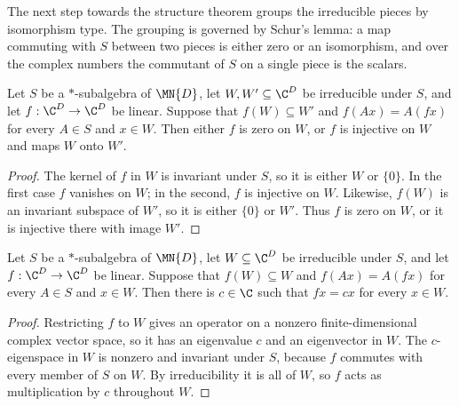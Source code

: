 The next step towards the structure theorem groups the irreducible pieces by
isomorphism type. The grouping is governed by Schur's lemma: a map commuting
with $S$ between two pieces is either zero or an isomorphism, and over the
complex numbers the commutant of $S$ on a single piece is the scalars.

\begin{lemma}%
    \label{lem:starSubalgebra_intertwiner_irreducible}
    \leanok
    Let $S$ be a $*$-subalgebra of $\MN{D}$, let
    $W,W'\subseteq\C^D$ be irreducible under $S$, and let
    $f:\C^D\to\C^D$ be linear. Suppose that $f(W)\subseteq W'$ and
    $f(Ax)=A(fx)$ for every $A\in S$ and $x\in W$. Then either $f$ is zero
    on $W$, or $f$ is injective on $W$ and maps $W$ onto $W'$.
\end{lemma}

\begin{proof}
    \leanok
    The kernel of $f$ in $W$ is invariant under $S$, so it is either $W$ or
    $\{0\}$. In the first case $f$ vanishes on $W$; in the second, $f$ is
    injective on $W$. Likewise, $f(W)$ is an invariant subspace of $W'$, so
    it is either $\{0\}$ or $W'$. Thus $f$ is zero on $W$, or it is
    injective there with image $W'$.
\end{proof}

\begin{lemma}%
    \label{lem:starSubalgebra_scalar_commutant_irreducible}
    \leanok
    Let $S$ be a $*$-subalgebra of $\MN{D}$, let
    $W\subseteq\C^D$ be irreducible under $S$, and let
    $f:\C^D\to\C^D$ be linear. Suppose that $f(W)\subseteq W$ and
    $f(Ax)=A(fx)$ for every $A\in S$ and $x\in W$. Then there is
    $c\in\C$ such that $fx=cx$ for every $x\in W$.
\end{lemma}

\begin{proof}
    \leanok
    Restricting $f$ to $W$ gives an operator on a nonzero
    finite-dimensional complex vector space, so it has an eigenvalue $c$
    and an eigenvector in $W$. The $c$-eigenspace in $W$ is nonzero and
    invariant under $S$, because $f$ commutes with every member of $S$ on
    $W$. By irreducibility it is all of $W$, so $f$ acts as multiplication
    by $c$ throughout $W$.
\end{proof}

